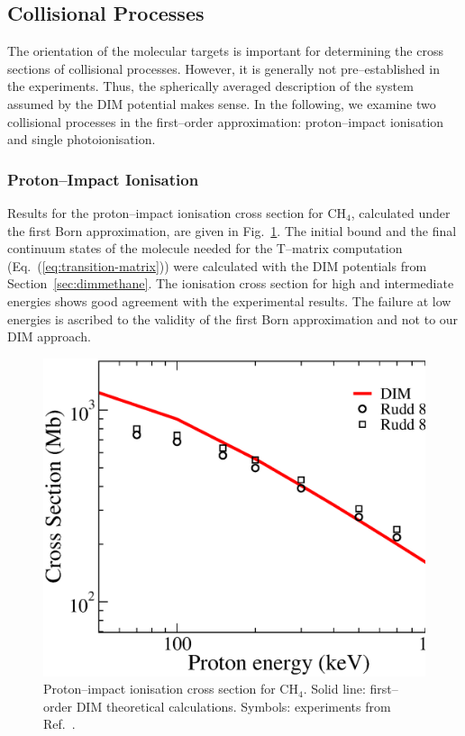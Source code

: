 \documentclass[10pt]{article}
\begin{document}
\subsection{Collisional Processes}

The orientation of the molecular targets is important for determining
the cross sections of collisional processes. However, it is generally 
not pre--established in the experiments. Thus, the spherically 
averaged description of the system assumed by the DIM potential 
makes sense. In the following, we examine two collisional processes 
in the first--order approximation: proton--impact ionisation and 
single photoionisation. 

\subsubsection{Proton--Impact Ionisation}

Results for the proton--impact ionisation cross section for CH$_4$,
calculated under the first Born approximation, are given in 
Fig.~\ref{fig:ionch4}. The initial bound and the final continuum 
states of the molecule needed for the T--matrix computation 
(Eq.~(\ref{eq:transition-matrix})) were calculated with the DIM 
potentials from Section~\ref{sec:dimmethane}. The ionisation cross 
section for high and intermediate energies shows good agreement with 
the experimental results. The failure at low energies is ascribed 
to the validity of the first Born approximation and not to our DIM 
approach.

\begin{figure}[H]
\centering
\includegraphics[height=0.23\textheight]{figures/dimpot/born_ionch4.eps}
\caption{Proton--impact ionisation cross section for CH$_4$. Solid 
line: first--order DIM theoretical calculations. Symbols: experiments 
from Ref.~\cite{Rudd1983,Rudd1985}.}
\label{fig:ionch4}
\end{figure}
\end{document}
